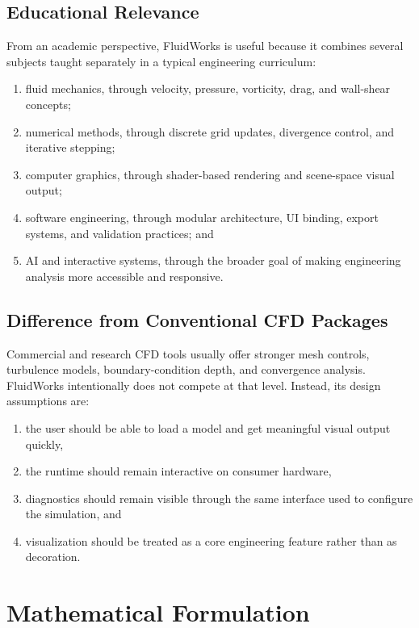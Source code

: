 \documentclass[12pt,a4paper,titlepage]{report}
\begin{document}
\section{Educational Relevance}
From an academic perspective, FluidWorks is useful because it combines several subjects taught separately in a typical engineering curriculum:
\begin{enumerate}
\item fluid mechanics, through velocity, pressure, vorticity, drag, and wall-shear concepts;
\item numerical methods, through discrete grid updates, divergence control, and iterative stepping;
\item computer graphics, through shader-based rendering and scene-space visual output;
\item software engineering, through modular architecture, UI binding, export systems, and validation practices; and
\item AI and interactive systems, through the broader goal of making engineering analysis more accessible and responsive.
\end{enumerate}

\section{Difference from Conventional CFD Packages}
Commercial and research CFD tools usually offer stronger mesh controls, turbulence models, boundary-condition depth, and convergence analysis. FluidWorks intentionally does not compete at that level. Instead, its design assumptions are:
\begin{enumerate}
\item the user should be able to load a model and get meaningful visual output quickly,
\item the runtime should remain interactive on consumer hardware,
\item diagnostics should remain visible through the same interface used to configure the simulation, and
\item visualization should be treated as a core engineering feature rather than as decoration.
\end{enumerate}

\chapter{Mathematical Formulation}
\end{document}
